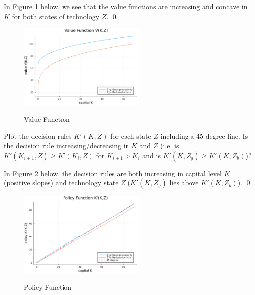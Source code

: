 \begin{solution}
    In Figure \ref{fig:VFI_stochastic} below, we see that the value functions are
    increasing and concave in $K$ for both states of technology $Z$. \qed
    \begin{figure}[H]
        \centering
        \caption{Value Function}
        \includegraphics[width=0.55\textwidth, angle=0]
        {Parallel_Stochastic_Value_Functions.png}
        \label{fig:VFI_stochastic}
    \end{figure}
\end{solution}



\begin{framedexercise}
    Plot the decision rules $K'(K,Z)$ for each state $Z$ including a 45 degree line.
    Is the decision rule increasing/decreasing in $K$ and $Z$ (i.e. is
    $K'(K_{i+1},Z) \geq K'(K_i,Z)$ for $K_{i+1} > K_i$ and is $K'(K,Z_g) \geq K'(K,Z_b)$)?
\end{framedexercise}

\begin{solution} In Figure \ref{fig:Policy_stochastic} below, the decision rules are
    both increasing in capital level $K$ (positive slopes) and technology state $Z$ ($K'(K, Z_g)$
    lies above $K'(K, Z_b)$). \qed
    \begin{figure}[H]
        \centering
        \caption{Policy Function}
        \includegraphics[width=0.55\textwidth, angle=0]
        {Parallel_Stochastic_Policy_Functions.png}
        \label{fig:Policy_stochastic}
    \end{figure}
\end{solution}

